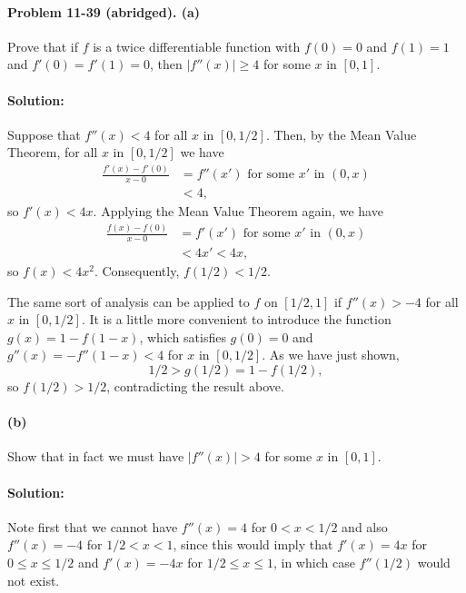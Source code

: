 \documentclass{article}
\begin{document}
\paragraph{Problem 11-39 (abridged). (a)} Prove that if $f$ is a twice
differentiable function with $f(0) = 0$ and $f(1) = 1$ and $f'(0) = f'(1) = 0$,
then $|f''(x)| \geq 4$ for some $x$ in $[0, 1]$.

\paragraph{Solution:} Suppose that $f''(x) < 4$ for all $x$ in $[0, 1/2]$.
Then, by the Mean Value Theorem, for all $x$ in $[0, 1/2]$ we have
\begin{align*}
  \frac{f'(x) - f'(0)}{x - 0} &= f''(x') \text{ for some } x' \text{ in } (0,
    x) \\
    &< 4,
\end{align*} so $f'(x) < 4x$. Applying the Mean Value Theorem again, we have
\begin{align*}
  \frac{f(x) - f(0)}{x - 0} &= f'(x') \text{ for some } x' \text{ in } (0, x)
    \\
    &< 4x' < 4x,
\end{align*} so $f(x) < 4x^2$. Consequently, $f(1/2) < 1/2$.

The same sort of analysis can be applied to $f$ on $[1/2, 1]$ if $f''(x) > -4$
for all $x$ in $[0, 1/2]$. It is a little more convenient to introduce the
function $g(x) = 1 - f(1 - x)$, which satisfies $g(0) = 0$ and $g''(x) = -f''(1
- x) < 4$ for $x$ in $[0, 1/2]$. As we have just shown, \begin{equation*}
  1/2 > g(1/2) = 1 - f(1/2),
\end{equation*} so $f(1/2) > 1/2$, contradicting the result above.

\paragraph{(b)} Show that in fact we must have $|f''(x)| > 4$ for some $x$ in
$[0, 1]$.

\paragraph{Solution:} Note first that we cannot have $f''(x) = 4$ for $0 < x <
1/2$ and also $f''(x) = -4$ for $1/2 < x < 1$, since this would imply that
$f'(x) = 4x$ for $0 \leq x \leq 1/2$ and $f'(x) = -4x$ for $1/2 \leq x \leq 1$,
in which case $f''(1/2)$ would not exist.
\end{document}
